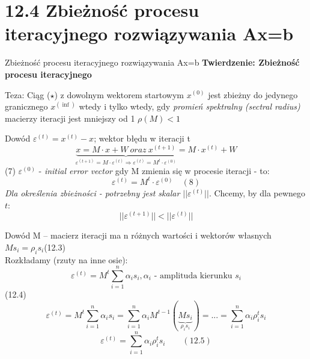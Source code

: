 \section{12.4 Zbieżność procesu iteracyjnego rozwiązywania Ax=b}

\begin{frame}{Zbieżność procesu iteracyjnego rozwiązywania Ax=b}
  \textbf{Twierdzenie: Zbieżność procesu iteracyjnego}
  \begin{block}{Teza:}
    \center Ciąg ($\star$) z dowolnym wektorem startowym $x^{(0)}$ jest zbieżny do jedynego granicznego $x^{(\inf)}$ wtedy i tylko wtedy, gdy \emph{promień spektralny (sectral radius)} macierzy iteracji jest mniejszy od 1
    \center $\rho(M)<1$
  \end{block}
\end{frame}

\begin{frame}{}
  \begin{block}{Dowód}
    $\varepsilon^{(t)}=x^{(t)}-x$; wektor błędu w iteracji t
    \[\underbrace{x=M \cdot x+W\ oraz\ x^{(t+1)}}_{\varepsilon^{(t+1)}=M \cdot \varepsilon^{(t)} \Rightarrow \varepsilon^{(t)}=M^t \cdot \varepsilon^{(0)}}=M \cdot x^{(t)}+W\]
    (7) $\varepsilon^{(0)}$ - \emph{initial error vector} gdy M zmienia się w procesie iteracji - to:
    \[{\varepsilon}^{(t)}=M^t \cdot {\varepsilon}^{(0)} \quad (8)\]
    \emph{Dla określenia zbieżności - potrzebny jest skalar $||\varepsilon^{(t)}||$}.
    Chcemy, by dla pewnego $t$:
    \[||\varepsilon^{(t+1)}||<||\varepsilon^{(t)}||\]
  \end{block}
\end{frame}

\begin{frame}{}
  \begin{block}{Dowód}
    M -- macierz iteracji ma n różnych wartości i wektorów własnych
    \\\hfill$Ms_i=\rho _is_i$\hfill (12.3)
    \newline
    \\Rozkładamy (rzuty na inne osie):
    \\\hfill\[\varepsilon^{(t)}=M^t \sum_{i = 1}^{n} \alpha _i s_i , \alpha _i \text{ - amplituda kierunku } s_i\]\hfill (12.4)
    \[\varepsilon^{(t)}=M^t \sum_{i = 1}^{n} \alpha _i s_i = \sum_{i = 1}^{n} \alpha _i M^{t-1}(\underbrace{Ms_i}_{\rho _i s_i}) = ... = \sum_{i = 1}^{n} \alpha _i \rho _i^t s_i \]
    \[\boxed{\varepsilon^{(t)}=\sum_{i = 1}^{n} \alpha _i \rho _i^t s_i} \qquad (12.5)\]
  \end{block}
\end{frame}

